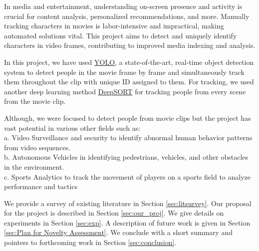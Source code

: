 \documentclass[twoside,english]{article}
\begin{document}

In media and entertainment, understanding on-screen presence and activity is crucial for content analysis, personalized recommendations, and more. Manually tracking characters in movies is labor-intensive and impractical, making automated solutions vital. This project aims to detect and uniquely identify characters in video frames, contributing to improved media indexing and analysis.

In this project, we have used \href{https://docs.ultralytics.com/}{YOLO}, a state-of-the-art, real-time object detection system to detect people in the movie frame by frame and simultaneously track them throughout the clip with unique ID assigned to them. For tracking, we used another deep learning method \href{ https://github.com/nwojke/deep_sort}{DeepSORT} for tracking people from every scene from the movie clip.

Although, we were focused to detect people from movie clips but the project has vast potential in various other fields such as: \\
a. Video Surveillance and security to identify abnormal human behavior patterns from video sequences.\\
b. Autonomous Vehicles in identifying pedestrians, vehicles, and other obstacles in the environment.\\
c. Sports Analytics to track the movement of players on a sports field to analyze performance and tactics

We provide a survey of existing literature in Section \ref{sec:litsurvey}. Our proposal for the project is described in Section \ref{sec:our_proj}. We give details on experiments in Section \ref{sec:exp}. A description of future work is given in Section \ref{sec:Plan for Novelty Assessment}. We conclude with a short summary and pointers to forthcoming work in Section \ref{sec:conclusion}.
\end{document}
